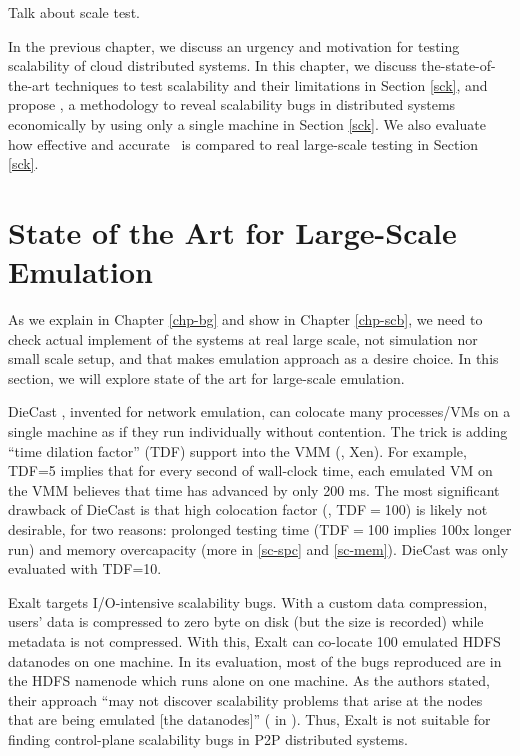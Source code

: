 Talk about scale test.

In the previous chapter, we discuss an urgency and motivation for testing
scalability of cloud distributed systems. In this chapter, we discuss
the-state-of-the-art techniques to test scalability and their limitations in
Section \ref{sck}, and propose \sck, a methodology to reveal scalability bugs in
distributed systems economically by using only a single machine in Section
\ref{sck}. We also evaluate how effective and accurate \sck\ is compared to real
large-scale testing in Section \ref{sck}.

\section{State of the Art for Large-Scale Emulation}
\label{mot-state}

As we explain in Chapter \ref{chp-bg} and show in Chapter \ref{chp-scb}, we need
to check actual implement of the systems at real large scale, not simulation nor
small scale setup, and that makes emulation approach as a desire choice. In this
section, we will explore state of the art for large-scale emulation.

%
DieCast \cite{Gupta+08-DieCast}, invented for network emulation, can colocate
many processes/VMs on a single machine as if they run individually without
contention.  The trick is adding ``time dilation factor'' (TDF) support
\cite{Gupta+06-TimeDilation} into the VMM (\eg, Xen).
%
For example, TDF=5 implies that for every second of wall-clock time, each
emulated VM on the VMM believes that time has advanced by only 200 ms.
%
The most significant drawback of DieCast is that high colocation factor (\eg,
TDF$=$100) is likely not desirable, for two reasons: prolonged testing time
(TDF$=$100 implies 100x longer run) and memory overcapacity (more in
\sec\ref{sc-spc} and \sec\ref{sc-mem}).  DieCast was only evaluated with TDF=10.


Exalt \cite{Wang+14-Exalt} targets I/O-intensive scalability bugs.  With a
custom data compression, users' data is compressed to zero byte on disk (but the
size is recorded) while metadata is not compressed.  With this, Exalt can
co-locate 100 emulated HDFS datanodes on one machine.  In its evaluation, most
of the bugs reproduced are in the HDFS namenode which runs alone on one machine.
As the authors stated, their approach ``may not discover scalability problems
that arise at the nodes that are being emulated [the datanodes]'' ( in
\cite{Wang+14-Exalt}).  Thus, Exalt is not suitable for finding control-plane
scalability bugs in P2P distributed systems. 



